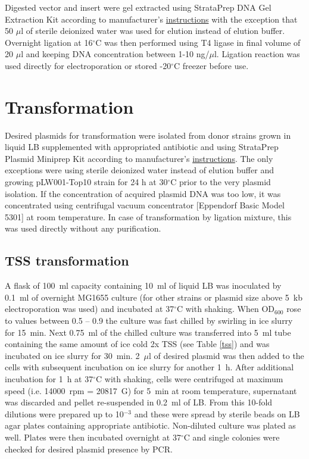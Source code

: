 Digested vector and insert were gel extracted using StrataPrep DNA Gel Extraction Kit according to manufacturer's \href{https://www.agilent.com/cs/library/usermanuals/public/400766.pdf}{instructions} with the exception that 50 $\mu$l of sterile deionized water was used for elution instead of elution buffer.
Overnight ligation at 16$^{\circ}$C was then performed using T4 ligase in final volume of 20 $\mu$l and keeping DNA concentration between 1-10 ng/$\mu$l.
Ligation reaction was used directly for electroporation or stored -20$^{\circ}$C freezer before use.

\section{Transformation}
Desired plasmids for transformation were isolated from donor strains grown in liquid LB supplemented with appropriated antibiotic and using StrataPrep Plasmid Miniprep Kit according to manufacturer's \href{https://www.agilent.com/cs/library/usermanuals/public/400766.pdf}{instructions}.
The only exceptions were using sterile deionized water instead of elution buffer and growing pLW001-Top10 strain for 24 h at 30$^{\circ}$C prior to the very plasmid isolation.
If the concentration of acquired plasmid DNA was too low, it was concentrated using centrifugal vacuum concentrator [Eppendorf\textsuperscript{\textregistered} Basic Model 5301] at room temperature.
In case of transformation by ligation mixture, this was used directly without any purification.

\subsection{TSS transformation}
A flask of 100~ml capacity containing 10~ml of liquid LB was inoculated by 0.1~ml of overnight MG1655 culture (for other strains or plasmid size above 5~kb electroporation was used) and incubated at 37$^{\circ}$C with shaking.
When OD$_{600}$ rose to values between 0.5 -- 0.9 the culture was fast chilled by swirling in ice slurry for 15~min.
Next 0.75~ml of the chilled culture was transferred into 5~ml tube containing the same amount of ice cold 2x TSS (see Table \ref{tss}) and was incubated on ice slurry for 30~min.
2~$\mu$l of desired plasmid was then added to the cells with subsequent incubation on ice slurry for another 1~h.
After additional incubation for 1~h at 37$^{\circ}$C with shaking, cells were centrifuged at maximum speed (i.e. 14000~rpm = 20817~G) for 5~min at room temperature, supernatant was discarded and pellet re-suspended in 0.2~ml of LB.
From this 10-fold dilutions were prepared up to 10$^{-3}$ and these were spread by sterile beads on LB agar plates containing appropriate antibiotic.
Non-diluted culture was plated as well.
Plates were then incubated overnight at 37$^{\circ}$C and single colonies were checked for desired plasmid presence by PCR.


